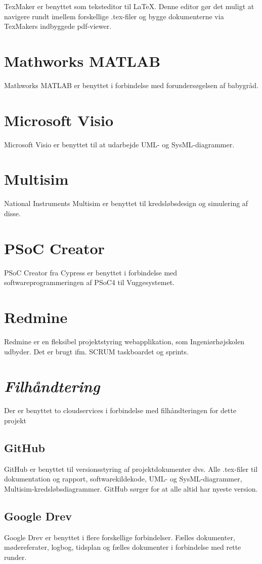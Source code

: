 TexMaker er benyttet som teksteditor til \LaTeX. Denne editor gør det muligt at navigere rundt imellem forskellige .tex-filer og bygge dokumenterne via TexMakers indbyggede pdf-viewer.

\section*{Mathworks MATLAB}
Mathworks MATLAB er benyttet i forbindelse med forundersøgelsen af babygråd. 

\section*{Microsoft Visio}
Microsoft Visio er benyttet til at udarbejde UML- og SysML-diagrammer. 

\section*{Multisim}
National Instruments Multisim er benyttet til kredsløbsdesign og simulering af disse. 

\section*{PSoC Creator}
PSoC Creator fra Cypress er benyttet i forbindelse med softwareprogrammeringen af PSoC4 til Vuggesystemet. 

\section*{Redmine}
Redmine er en fleksibel projektstyring webapplikation, som Ingeniørhøjskolen udbyder. Det er brugt ifm. SCRUM taskboardet og sprints.

\section*{\textit{Filhåndtering}}
Der er benyttet to cloudservices i forbindelse med filhåndteringen for dette projekt

\subsection*{GitHub}
GitHub er benyttet til versionsstyring af projektdokumenter dvs. Alle .tex-filer til dokumentation og rapport, softwarekildekode, UML- og SysML-diagrammer, Multisim-kredsløbsdiagrammer. GitHub sørger for at alle altid har nyeste version. 

\subsection*{Google Drev}
Google Drev er benyttet i flere forskellige forbindelser. Fælles dokumenter, mødereferater, logbog, tidsplan og fælles dokumenter i forbindelse med rette runder.